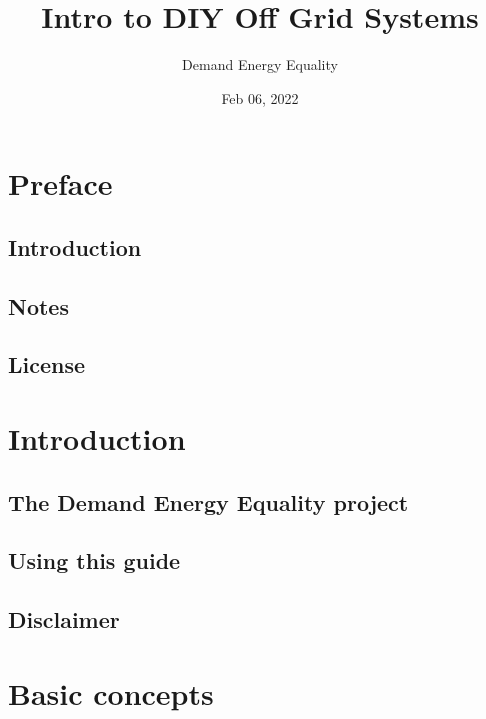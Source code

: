 \documentclass[letterpaper,10pt,english]{sphinxmanual}
\title{Intro to DIY Off Grid Systems}
\date{Feb 06, 2022}
\author{Demand Energy Equality}
\begin{document}
\pagestyle{empty}
\sphinxmaketitle
\pagestyle{plain}
\sphinxtableofcontents
\pagestyle{normal}
\label{\detokenize{index::doc}}



\chapter{Preface}
\label{\detokenize{preface:preface}}\label{\detokenize{preface::doc}}

\section{Introduction}
\label{\detokenize{preface:introduction}}

\section{Notes}
\label{\detokenize{preface:notes}}

\section{License}
\label{\detokenize{preface:license}}

\chapter{Introduction}
\label{\detokenize{introduction:introduction}}\label{\detokenize{introduction::doc}}

\section{The Demand Energy Equality project}
\label{\detokenize{introduction:the-demand-energy-equality-project}}

\section{Using this guide}
\label{\detokenize{introduction:using-this-guide}}

\section{Disclaimer}
\label{\detokenize{introduction:disclaimer}}

\chapter{Basic concepts}
\label{\detokenize{basic_concepts:basic-concepts}}\label{\detokenize{basic_concepts::doc}}
\end{document}
